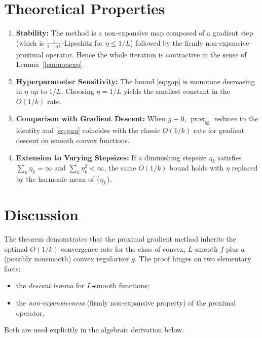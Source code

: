 \documentclass{article}
\newcommand{\prox}{\operatorname{prox}}
\begin{document}
\section*{Theoretical Properties}
\begin{enumerate}[label=\textbf{P\arabic*:}, leftmargin=*]
\item \textbf{Stability:} The method is a non‑expansive map composed of a gradient step (which is $\tfrac{1}{1-\eta L}$‑Lipschitz for $\eta\le1/L$) followed by the firmly non‑expansive proximal operator. Hence the whole iteration is contractive in the sense of Lemma~\ref{lem:nonexp}.
\item \textbf{Hyperparameter Sensitivity:} The bound \eqref{eq:gap} is monotone decreasing in $\eta$ up to $1/L$. Choosing $\eta=1/L$ yields the smallest constant in the $O(1/k)$ rate.
\item \textbf{Comparison with Gradient Descent:} When $g\equiv0$, $\prox_{\eta g}$ reduces to the identity and \eqref{eq:gap} coincides with the classic $O(1/k)$ rate for gradient descent on smooth convex functions.
\item \textbf{Extension to Varying Stepsizes:} If a diminishing stepsize $\eta_k$ satisfies $\sum_{k}\eta_k=\infty$ and $\sum_{k}\eta_k^2<\infty$, the same $O(1/k)$ bound holds with $\eta$ replaced by the harmonic mean of $\{\eta_k\}$.
\end{enumerate}

\section*{Discussion}
The theorem demonstrates that the proximal gradient method inherits the optimal $O(1/k)$ convergence rate for the class of convex, $L$‑smooth $f$ plus a (possibly nonsmooth) convex regulariser $g$. The proof hinges on two elementary facts:
\begin{itemize}
\item the \emph{descent lemma} for $L$‑smooth functions;
\item the \emph{non‑expansiveness} (firmly non‑expansive property) of the proximal operator.
\end{itemize}
Both are used explicitly in the algebraic derivation below.

\newpage
\end{document}

